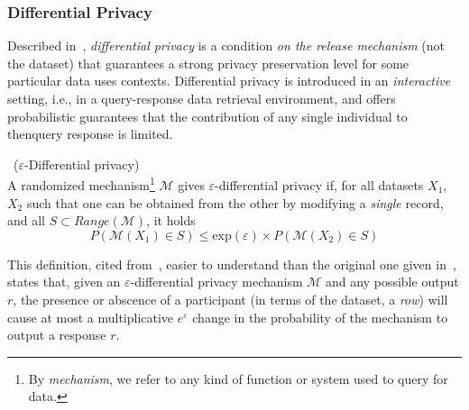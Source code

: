 \subsubsection{Differential Privacy}
\label{Theory:SDC:Guarantees:DifferentialPrivacy}

Described in~\citet{Dwork:DifferentialPrivacy}, \textit{differential privacy} is a condition \textit{on the release mechanism} (not the dataset) that guarantees a strong privacy preservation level for some particular data uses contexts. Differential privacy is introduced in an \textit{interactive} setting, i.e., in a query-response data retrieval environment, and offers probabilistic guarantees that the contribution of any single individual to thenquery response is limited.

\begin{definition}~($\varepsilon$-Differential privacy)\\
A randomized mechanism\footnote{By \textit{mechanism}, we refer to any kind of function or system used to query for data.} $\mathcal{M}$ gives $\varepsilon$-differential privacy if, for all datasets $X_1$, $X_2$ such that one can be obtained from the other by modifying a \textit{single} record, and all $S \subset Range(\mathcal{M})$, it holds
\begin{equation}
P(\mathcal{M}(X_1) \in S) \leq \mathrm{exp}(\varepsilon) \times P(\mathcal{M}(X_2) \in S)
\end{equation}
\end{definition}

This definition, cited from~\citet{Domingo:EnhancingDiffPrivMicroaggregation}, easier to understand than the original one given in~\citet{Dwork:DifferentialPrivacy}, states that, given an $\varepsilon$-differential privacy mechanism $\mathcal{M}$ and any possible output $r$, the presence or abscence of a participant (in terms of the dataset, a \textit{row}) will cause at most a multiplicative $e^\varepsilon$ change in the probability of the mechanism to output a response $r$.